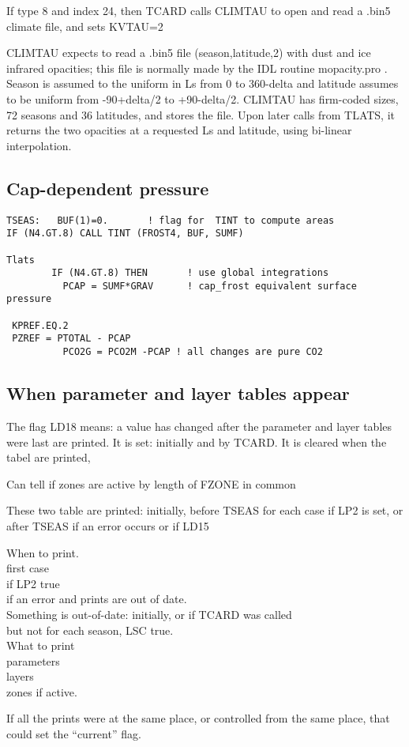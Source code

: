 \documentclass{article}
\newcommand{\qi}{\\ \hspace*{2.em}}      %
\newcommand{\qii}{\\ \hspace*{4.em}}     %
\begin{document}
If type 8 and index 24, then TCARD calls CLIMTAU to open and read a .bin5 
climate file, and sets KVTAU=2

CLIMTAU expects to read a .bin5 file (season,latitude,2) with dust and ice
infrared opacities; this file is normally made by the IDL routine mopacity.pro .
Season is assumed to the uniform in Ls from 0 to 360-delta and latitude assumes
to be uniform from -90+delta/2 to +90-delta/2. CLIMTAU has firm-coded sizes, 72
seasons and 36 latitudes, and stores the file. Upon later calls from TLATS, it
returns the two opacities at a requested Ls and latitude, using bi-linear
interpolation.

\subsection{ Cap-dependent pressure} %
\vspace{-3.mm} 
\begin{verbatim}
TSEAS:   BUF(1)=0.       ! flag for  TINT to compute areas
IF (N4.GT.8) CALL TINT (FROST4, BUF, SUMF)

Tlats
        IF (N4.GT.8) THEN       ! use global integrations
          PCAP = SUMF*GRAV      ! cap_frost equivalent surface pressure

 KPREF.EQ.2
 PZREF = PTOTAL - PCAP
          PCO2G = PCO2M -PCAP ! all changes are pure CO2

\end{verbatim}
\subsection{ When parameter and layer tables appear} %
The flag LD18 means: a value has changed after the parameter and layer tables
were last are printed. It is set: initially and by TCARD. It is cleared when the
tabel are printed,

 Can tell if zones are active by length of FZONE in common

These two table are printed: initially, before TSEAS for each case if LP2 is
set, or after TSEAS if an error occurs or if LD15

When to print.
\qi first case
\qi if LP2 true
\qi if an error and prints are out of date.
\qii Something is out-of-date: initially, or if TCARD was called
\qii but not for each season, LSC true.
\\ What to print
\qi parameters
\qi layers
\qi zones if active.

If all the prints were at the same place, or controlled from the same place,
that could set the ``current'' flag.
\end{document}
